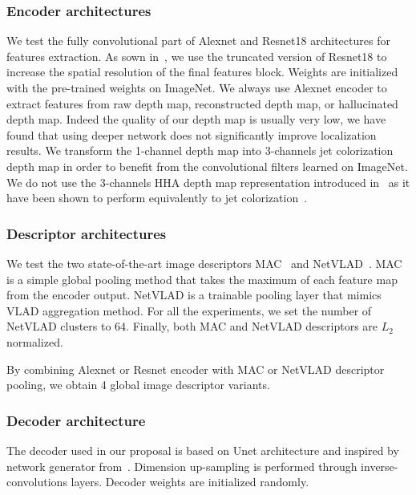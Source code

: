 \subsubsection{Encoder architectures} 
We test the fully convolutional part of Alexnet and Resnet18 architectures for features extraction. As sown in~\cite{Piasco2019a}, we use the truncated version of Resnet18 to increase the spatial resolution of the final features block. Weights are initialized with the pre-trained weights on ImageNet. We always use Alexnet encoder to extract features from raw depth map, reconstructed depth map, or hallucinated depth map. Indeed the quality of our depth map is usually very low, we have found that using deeper network does not significantly improve localization results. We transform the 1-channel depth map into 3-channels jet colorization depth map in order to benefit from the convolutional filters learned on ImageNet. We do not use the 3-channels HHA depth map representation introduced in~\cite{Gupta2014} as it have been shown to perform equivalently to jet colorization~\cite{Eitel2015}.

\subsubsection{Descriptor architectures}
We test the two state-of-the-art image descriptors MAC~\cite{Radenovic2017} and NetVLAD~\cite{Arandjelovic2017}. MAC is a simple global pooling method that takes the maximum of each feature map from the encoder output. NetVLAD is a trainable pooling layer that mimics VLAD aggregation method. For all the experiments, we set the number of NetVLAD clusters to 64. Finally, both MAC and NetVLAD descriptors are $L_{2}$ normalized.

By combining Alexnet or Resnet encoder with MAC or NetVLAD descriptor pooling, we obtain 4 global image descriptor variants.

\subsubsection{Decoder architecture}
The decoder used in our proposal is based on Unet architecture and inspired by network generator from~\cite{Isola2017}. Dimension up-sampling is performed through inverse-convolutions layers. Decoder weights are initialized randomly.

